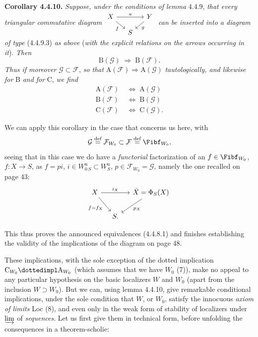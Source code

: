 \textbf{Corollary 4.4.10.} \textit{Suppose, under the conditions of lemma} 4.4.9, \textit{that every triangular commutative diagram} $\begin{tikzcd}[column sep=small, row sep=small, ampersand replacement=\&]
X \arrow[rr, "u"] \arrow[dr, "f"'] \& \& Y \arrow[dl, "g"] \\
\& S \&
\end{tikzcd}$ \textit{can be inserted into a diagram of type} (4.4.9.3) \textit{as above} (\textit{with the explicit relations on the arrows occurring in it}). \textit{Then}
\[
\mathrm{B}(\mathcal{G}) \;\Longrightarrow\; \mathrm{B}(\mathcal{F}).
\]
\textit{Thus if moreover} $\mathcal{G} \subset \mathcal{F}$, \textit{so that} $\mathrm{A}(\mathcal{F}) \Longrightarrow \mathrm{A}(\mathcal{G})$ \textit{tautologically, and likewise for} B \textit{and for} C, \textit{we find}
\[
\begin{aligned}
\mathrm{A}(\mathcal{F}) &\;\Longleftrightarrow\; \mathrm{A}(\mathcal{G})\\
\mathrm{B}(\mathcal{F}) &\;\Longleftrightarrow\; \mathrm{B}(\mathcal{G})\\
\mathrm{C}(\mathcal{F}) &\;\Longleftrightarrow\; \mathrm{C}(\mathcal{G}).
\end{aligned}
\]

We can apply this corollary in the case that concerns us here, with
\[
\mathcal{G} \overset{\text{def}}{=} \mathcal{F}_{W_0} \subset \mathcal{F} \overset{\text{def}}{=} \Fibf_{W_0},
\]
seeing that in this case we do have a \textit{functorial} factorization of an $f \in \Fibf_{W_0}$, $f : X \longrightarrow S$, as $f = pi$, $i \in W^{\mathrm{u}}_{0\,S} \subset W^{\mathrm{u}}_S$, $p \in \mathcal{F}_{W_0} = \mathcal{G}$, namely the one recalled on page 43:
\[
\begin{tikzcd}[column sep=small]
X \arrow[rr, "i_X"] \arrow[dr, "f=f_X"'] & & \bar{X} = \Phi_S(X) \arrow[dl, "p_X"] \\
& S. &
\end{tikzcd}
\]

This thus proves the announced equivalences (4.4.8.1) and finishes establishing the validity of the implications of the diagram on page 48.

These implications, with the sole exception of the dotted implication $\mathrm{C}_{W_0} \dottedimpl \mathrm{A}_{W_0}$ (which assumes that we have $W_0$ (7)), make no appeal to any particular hypothesis on the basic localizers $W$ and $W_0$ (apart from the inclusion $W \supset W_0$). But we can, using lemma 4.4.10, give remarkable conditional implications, under the sole condition that $W$, or $W_0$, satisfy the innocuous \textit{axiom}
\textit{of limits} Loc (8), and even only in the weak form of stability of localizers under $\varinjlim$ of \textit{sequences}. Let us first give them in technical form, before unfolding the consequences in a theorem-scholie:

